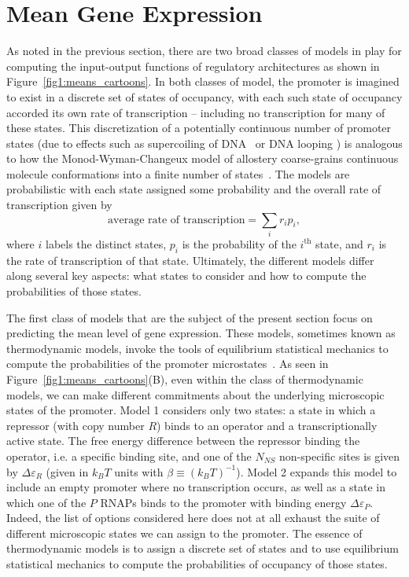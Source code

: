 \section{Mean Gene Expression}\label{section_02_means}

As noted in the previous section, there are two broad classes of models in play
for computing the input-output functions of regulatory architectures as shown in
Figure~\ref{fig1:means_cartoons}. In both classes of model, the promoter is
imagined to exist in a discrete set of states of occupancy, with each such state
of occupancy accorded its own rate of transcription -- including no
transcription for many of these states. This discretization of a potentially
continuous number of promoter states (due to effects such as supercoiling of
DNA~\cite{Chong2014, Sevier2016} or DNA looping \cite{Boedicker2013a}) is
analogous to how the Monod-Wyman-Changeux model of allostery coarse-grains
continuous molecule conformations into a finite number of
states~\cite{Martins2011}. The models are probabilistic with each state assigned
some probability and the overall rate of transcription given by 
\begin{equation}
\mbox{average rate of transcription} = \sum_i r_i p_i,
\label{eq:transcrip_prop_pbound}
\end{equation}
where $i$ labels the distinct states, $p_i$ is the probability of the
$i^{\text{th}}$ state, and $r_i$ is the rate of transcription of that state.
Ultimately, the different models differ along several key aspects: what states
to consider and how to compute the probabilities of those states.

The first class of models that are the subject of the present section focus on
predicting the mean level of gene expression. These models, sometimes known as
thermodynamic models, invoke the tools of equilibrium statistical mechanics to
compute the probabilities of the promoter microstates~\cite{Ackers1982,
Shea1985, Buchler2003, Vilar2003a, Vilar2003b, Bintu2005a, Bintu2005c,
Gertz2009, Sherman2012, Saiz2013}. As seen in
Figure~\ref{fig1:means_cartoons}(B), even within the class of thermodynamic
models, we can make different commitments about the underlying microscopic
states of the promoter. Model 1 considers only two states: a state in which a
repressor (with copy number $R$) binds to an operator and a transcriptionally
active state. The free energy difference between the repressor binding the
operator, i.e. a specific binding site, and one of the $N_{NS}$ non-specific
sites is given by $\Delta\varepsilon_R$ (given in $k_BT$ units with $\beta\equiv
(k_BT)^{-1}$). Model 2 expands this model to include an empty promoter where no
transcription occurs, as well as a state in which one of the $P$ RNAPs binds to
the promoter with binding energy $\Delta\varepsilon_P$. Indeed, the list of
options considered here does not at all exhaust the suite of different
microscopic states we can assign to the promoter. The essence of thermodynamic 
models is to assign a discrete set of states and to use equilibrium statistical 
mechanics to compute the probabilities of occupancy of those states.

